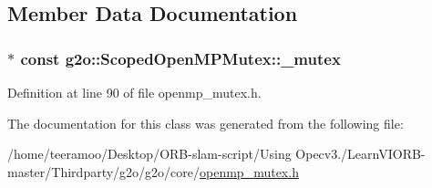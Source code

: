 \subsection{Member Data Documentation}
\subsubsection[{\texorpdfstring{\+\_\+mutex}{_mutex}}]{$\ast$ const g2o\+::\+Scoped\+Open\+M\+P\+Mutex\+::\+\_\+mutex\hspace{0.3cm}{\ttfamily [private]}}\hypertarget{classg2o_1_1ScopedOpenMPMutex_a6fc0c5ebf1c40a7de6821f9ba78ea68f}{}\label{classg2o_1_1ScopedOpenMPMutex_a6fc0c5ebf1c40a7de6821f9ba78ea68f}


Definition at line 90 of file openmp\+\_\+mutex.\+h.



The documentation for this class was generated from the following file\+:\begin{DoxyCompactItemize}
\item 
/home/teeramoo/\+Desktop/\+O\+R\+B-\/slam-\/script/\+Using Opecv3./\+Learn\+V\+I\+O\+R\+B-\/master/\+Thirdparty/g2o/g2o/core/\hyperlink{openmp__mutex_8h}{openmp\+\_\+mutex.\+h}\end{DoxyCompactItemize}
